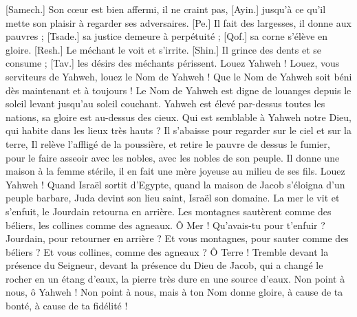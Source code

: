 \begin{multicols}{2}
[Samech.] Son cœur est bien affermi, il ne craint pas, [Ayin.] jusqu'à ce qu'il mette son plaisir à regarder ses adversaires.
[Pe.] Il fait des largesses, il donne aux pauvres ; [Tsade.] sa justice demeure à perpétuité ; [Qof.] sa corne s'élève en gloire.
[Resh.] Le méchant le voit et s'irrite. [Shin.] Il grince des dents et se consume ; [Tav.] les désirs des méchants périssent.
\VerseOne{}Louez Yahweh ! Louez, vous serviteurs de Yahweh, louez le Nom de Yahweh !
Que le Nom de Yahweh soit béni dès maintenant et à toujours !
Le Nom de Yahweh est digne de louanges depuis le soleil levant jusqu'au soleil couchant.
Yahweh est élevé par-dessus toutes les nations, sa gloire est au-dessus des cieux.
Qui est semblable à Yahweh notre Dieu, qui habite dans les lieux très hauts ?
Il s'abaisse pour regarder sur le ciel et sur la terre,
Il relève l'affligé de la poussière, et retire le pauvre de dessus le fumier,
pour le faire asseoir avec les nobles, avec les nobles de son peuple.
Il donne une maison à la femme stérile, il en fait une mère joyeuse au milieu de ses fils. Louez Yahweh !
\VerseOne{}Quand Israël sortit d'Egypte, quand la maison de Jacob s'éloigna d'un peuple barbare,
Juda devint son lieu saint, Israël son domaine.
La mer le vit et s'enfuit, le Jourdain retourna en arrière.
Les montagnes sautèrent comme des béliers, les collines comme des agneaux.
Ô Mer ! Qu'avais-tu pour t'enfuir ? Jourdain, pour retourner en arrière ?
Et vous montagnes, pour sauter comme des béliers ? Et vous collines, comme des agneaux ?
Ô Terre ! Tremble devant la présence du Seigneur, devant la présence du Dieu de Jacob,
qui a changé le rocher en un étang d'eaux, la pierre très dure en une source d'eaux.
\VerseOne{}Non point à nous, ô Yahweh ! Non point à nous, mais à ton Nom donne gloire, à cause de ta bonté, à cause de ta fidélité !

\end{multicols}
